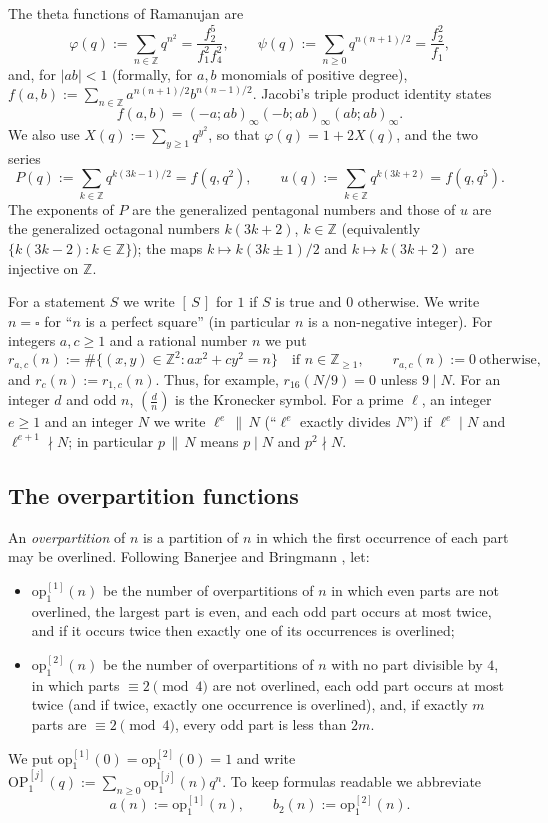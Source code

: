 \documentclass[11pt]{amsart}
\theoremstyle{definition}
\theoremstyle{remark}
\numberwithin{equation}{section}
\newcommand{\op}{\mathrm{op}}
\newcommand{\OP}{\mathrm{OP}}
\newcommand{\Z}{\mathbb{Z}}
\newcommand{\sq}{\square}
\newcommand{\ind}[1]{[\,#1\,]}
\begin{document}
The theta functions of Ramanujan are
\begin{equation}\label{eq:phipsi}
\varphi(q):=\sum_{n\in\Z}q^{n^2}=\frac{f_2^5}{f_1^2f_4^2},\qquad
\psi(q):=\sum_{n\ge 0}q^{n(n+1)/2}=\frac{f_2^2}{f_1},
\end{equation}
and, for $|ab|<1$ (formally, for $a,b$ monomials of positive degree), $f(a,b):=\sum_{n\in\Z}a^{n(n+1)/2}b^{n(n-1)/2}$. Jacobi's triple product identity states
\begin{equation}\label{eq:JTP}
f(a,b)=(-a;ab)_\infty(-b;ab)_\infty(ab;ab)_\infty .
\end{equation}
We also use $X(q):=\sum_{y\ge1}q^{y^2}$, so that $\varphi(q)=1+2X(q)$, and the two series
\begin{equation}\label{eq:Pu}
P(q):=\sum_{k\in\Z}q^{k(3k-1)/2}=f(q,q^2),\qquad u(q):=\sum_{k\in\Z}q^{k(3k+2)}=f(q,q^5).
\end{equation}
The exponents of $P$ are the generalized pentagonal numbers and those of $u$ are the generalized octagonal numbers $k(3k+2)$, $k\in\Z$ (equivalently $\{k(3k-2):k\in\Z\}$); the maps $k\mapsto k(3k\pm1)/2$ and $k\mapsto k(3k+2)$ are injective on $\Z$.

For a statement $S$ we write $\ind{S}$ for $1$ if $S$ is true and $0$ otherwise. We write $n=\sq$ for ``$n$ is a perfect square'' (in particular $n$ is a non-negative integer). For integers $a,c\ge 1$ and a rational number $n$ we put
\[
r_{a,c}(n):=\#\{(x,y)\in\Z^2: ax^2+cy^2=n\}\quad\text{if } n\in\Z_{\ge1},\qquad r_{a,c}(n):=0\ \text{otherwise},
\]
and $r_c(n):=r_{1,c}(n)$. Thus, for example, $r_{16}(N/9)=0$ unless $9\mid N$. For an integer $d$ and odd $n$, $\left(\frac{d}{n}\right)$ is the Kronecker symbol. For a prime $\ell$, an integer $e\ge1$ and an integer $N$ we write $\ell^e\,\|\,N$ (``$\ell^e$ exactly divides $N$'') if $\ell^e\mid N$ and $\ell^{e+1}\nmid N$; in particular $p\,\|\,N$ means $p\mid N$ and $p^2\nmid N$.

\subsection{The overpartition functions}
An \emph{overpartition} of $n$ is a partition of $n$ in which the first occurrence of each part may be overlined. Following Banerjee and Bringmann \cite[\S1]{BB}, let:
\begin{itemize}[leftmargin=2em]
\item $\op_1^{[1]}(n)$ be the number of overpartitions of $n$ in which even parts are not overlined, the largest part is even, and each odd part occurs at most twice, and if it occurs twice then exactly one of its occurrences is overlined;
\item $\op_1^{[2]}(n)$ be the number of overpartitions of $n$ with no part divisible by $4$, in which parts $\equiv 2\pmod 4$ are not overlined, each odd part occurs at most twice (and if twice, exactly one occurrence is overlined), and, if exactly $m$ parts are $\equiv 2\pmod 4$, every odd part is less than $2m$.
\end{itemize}
We put $\op_1^{[1]}(0)=\op_1^{[2]}(0)=1$ and write $\OP_1^{[j]}(q):=\sum_{n\ge0}\op_1^{[j]}(n)q^n$. To keep formulas readable we abbreviate
\[
a(n):=\op_1^{[1]}(n),\qquad b_2(n):=\op_1^{[2]}(n).
\]
\end{document}
